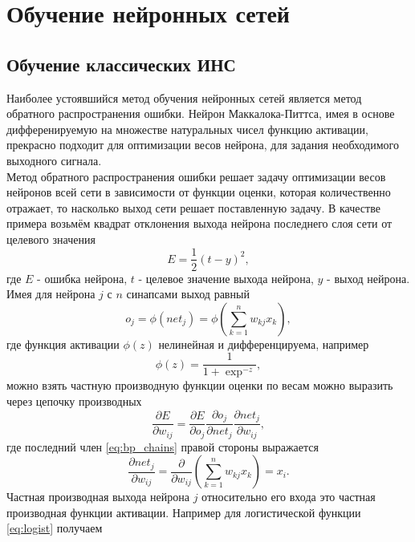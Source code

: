 \documentclass[a4paper,10pt]{article}
\begin{document}
\section{Обучение нейронных сетей}
\subsection{Обучение классических ИНС}
\indent Наиболее устоявшийся метод обучения нейронных сетей является метод обратного распространения ошибки. Нейрон Маккалока-Питтса, имея в основе дифференируемую на множестве натуральных чисел функцию активации, прекрасно подходит для оптимизации весов нейрона, для задания необходимого выходного сигнала.\\  
\indent Метод обратного распространения ошибки решает задачу оптимизации весов нейронов всей сети в зависимости от функции оценки, которая количественно отражает, то насколько выход сети решает поставленную задачу. В качестве примера возьмём квадрат отклонения выхода нейрона последнего слоя сети от целевого значения
\begin{equation}
E = \frac{1}{2}(t-y)^2,
\end{equation} 
где $E$ - ошибка нейрона, $t$ - целевое значение выхода нейрона, $y$ - выход нейрона.\\
\indent Имея для нейрона $j$ с $n$ синапсами выход равный
\begin{equation}
o_{j}=\phi (net_{j}) = \phi \left(\sum_{k=1}^{n}w_{kj}x_{k}\right),
\end{equation}
где функция активации $\phi(z)$ нелинейная и дифференцируема, например
\begin{equation}\label{eq:logist}
\phi(z)=\frac{1}{1+\exp^{-z}},
\end{equation}
можно взять частную производную функции оценки по весам можно выразить через цепочку производных
\begin{equation}\label{eq:bp_chains}
\frac{\partial E}{\partial w_{ij}} = \frac{\partial E}{\partial o_{j}} \frac{{\partial o_{j}}}{\partial net_{j}} \frac{{\partial net_{j}}}{\partial w_{ij}},
\end{equation}
где последний член \eqref{eq:bp_chains} правой стороны выражается
\begin{equation}
\frac{{\partial net_{j}}}{\partial w_{ij}} = \frac{\partial}{\partial w_{ij}} \left(\sum_{k=1}^{n}w_{kj}x_{k}\right) = x_{i}.
\end{equation}
\indent Частная производная выхода нейрона $j$ относительно его входа это частная производная функции активации. Например для логистической функции \eqref{eq:logist} получаем
\end{document}
